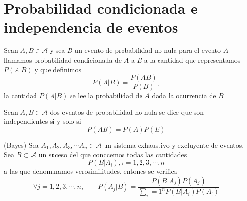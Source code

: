 \subsubsection{}

\section{Probabilidad condicionada e independencia de eventos}%

\begin{definition}
Sean $A,B\in\mathcal{A}$ y sea $B$ un evento de probabilidad no nula para el
evento $A$, llamamos probabilidad condicionada de $A$ a $B$ a la cantidad que
representamos $P\left(   A|B\right)   $ y que definimos \[ P\left(
A|B\right)   =\frac{P\left(   AB\right)   }{P\left(   B\right)   }, \] la
cantidad $P\left(   A|B\right)   $ se lee la probabilidad de $A$ dada la
ocu\-rrencia de $B$
\end{definition} %

\begin{definition}
Sean $A,B\in\mathcal{A}$ dos eventos de probabilidad no nula se dice que son
independientes si y solo si \[ P\left(   AB\right)   =P\left(   A\right)
P\left(   B\right)  \]
\end{definition}%

\begin{theorem}
(Bayes) Sea $A_{1},A_{2},A_{3},\cdots A_{n}\in\mathcal{A}$ un sistema
exhaustivo y excluyente de eventos. Sea $B\subset\mathcal{A}$ un suceso del
que conocemos todas las cantidades \[ P\left(   B|A_i\right)   ,i=1,2,3,\cdots
,n \] a las que denominamos verosimilitudes, entones se verifica \[ \forall
j=1,2,3,\cdots,n,\qquad P\left(   A_j|B\right)   =\frac{P\left(
B|A_j\right)   P\left(   A_j\right)   }{\sum_i=1^nP\left(   B|A_i
\right)   P\left(   A_i\right)   }
\]
\end{theorem} 